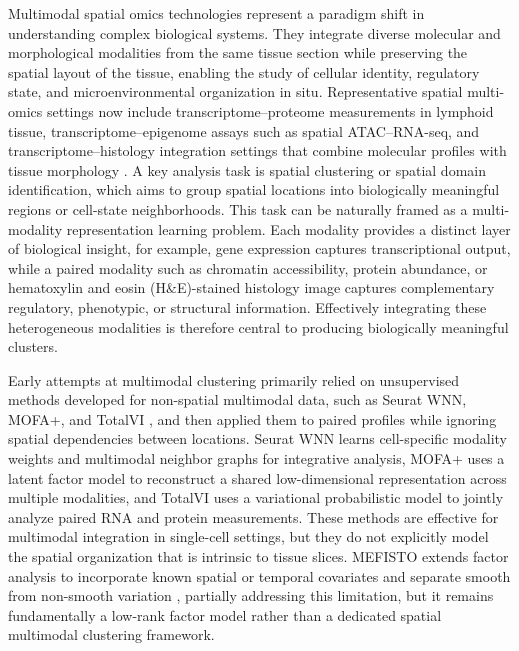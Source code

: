\documentclass{article}
\theoremstyle{plain}
\theoremstyle{definition}
\begin{document}
Multimodal spatial omics technologies represent a paradigm shift in understanding complex biological systems. They integrate diverse molecular and morphological modalities from the same tissue section while preserving the spatial layout of the tissue, enabling the study of cellular identity, regulatory state, and microenvironmental organization in situ. Representative spatial multi-omics settings now include transcriptome--proteome measurements in lymphoid tissue, transcriptome--epigenome assays such as spatial ATAC--RNA-seq, and transcriptome--histology integration settings that combine molecular profiles with tissue morphology \cite{long2024spatialglue,zhang2023spatial,zuo2023misar,coleman2025miso}. A key analysis task is spatial clustering or spatial domain identification, which aims to group spatial locations into biologically meaningful regions or cell-state neighborhoods. This task can be naturally framed as a multi-modality representation learning problem. Each modality provides a distinct layer of biological insight, for example, gene expression captures transcriptional output, while a paired modality such as chromatin accessibility, protein abundance, or hematoxylin and eosin (H$\&$E)-stained histology image captures complementary regulatory, phenotypic, or structural information. Effectively integrating these heterogeneous modalities is therefore central to producing biologically meaningful clusters.

Early attempts at multimodal clustering primarily relied on unsupervised methods developed for non-spatial multimodal data, such as Seurat WNN, MOFA+, and TotalVI \cite{hao2021seurat,argelaguet2020mofa,gayoso2021totalvi}, and then applied them to paired profiles while ignoring spatial dependencies between locations. Seurat WNN learns cell-specific modality weights and multimodal neighbor graphs for integrative analysis, MOFA+ uses a latent factor model to reconstruct a shared low-dimensional representation across multiple modalities, and TotalVI uses a variational probabilistic model to jointly analyze paired RNA and protein measurements. These methods are effective for multimodal integration in single-cell settings, but they do not explicitly model the spatial organization that is intrinsic to tissue slices. MEFISTO extends factor analysis to incorporate known spatial or temporal covariates and separate smooth from non-smooth variation \cite{velten2022mefisto}, partially addressing this limitation, but it remains fundamentally a low-rank factor model rather than a dedicated spatial multimodal clustering framework.
\end{document}

